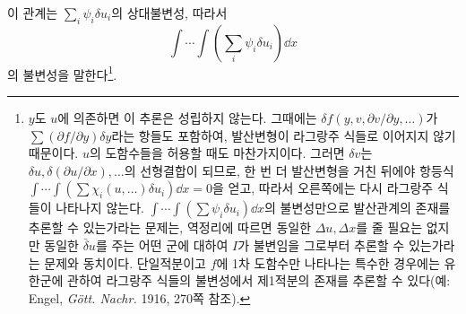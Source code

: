 이 관계는 \(\sum_i\psi_i\delta u_i\)의 상대불변성, 따라서
\[
\int\!\cdots\!\int
\left(\sum_i\psi_i\delta u_i\right)\dd x
\]
의 불변성을 말한다\footnote{\(y\)도 \(u\)에 의존하면 이 추론은 성립하지 않는다. 그때에는 \(\delta f(y,v,\partial v/\partial y,\ldots)\)가 \(\sum(\partial f/\partial y)\delta y\)라는 항들도 포함하여, 발산변형이 라그랑주 식들로 이어지지 않기 때문이다. \(u\)의 도함수들을 허용할 때도 마찬가지이다. 그러면 \(\delta v\)는 \(\delta u,\delta(\partial u/\partial x),\ldots\)의 선형결합이 되므로, 한 번 더 발산변형을 거친 뒤에야 항등식 \(\int\!\cdots\!\int(\sum\chi_i(u,\ldots)\delta u_i)\dd x=0\)을 얻고, 따라서 오른쪽에는 다시 라그랑주 식들이 나타나지 않는다. \(\int\!\cdots\!\int(\sum\psi_i\delta u_i)\dd x\)의 불변성만으로 발산관계의 존재를 추론할 수 있는가라는 문제는, 역정리에 따르면 동일한 \(\Delta u,\Delta x\)를 줄 필요는 없지만 동일한 \(\bar\delta u\)를 주는 어떤 군에 대하여 \(I\)가 불변임을 그로부터 추론할 수 있는가라는 문제와 동치이다. 단일적분이고 \(f\)에 1차 도함수만 나타나는 특수한 경우에는 유한군에 관하여 라그랑주 식들의 불변성에서 제1적분의 존재를 추론할 수 있다(예: Engel, \emph{Gött. Nachr.} 1916, 270쪽 참조).}.

